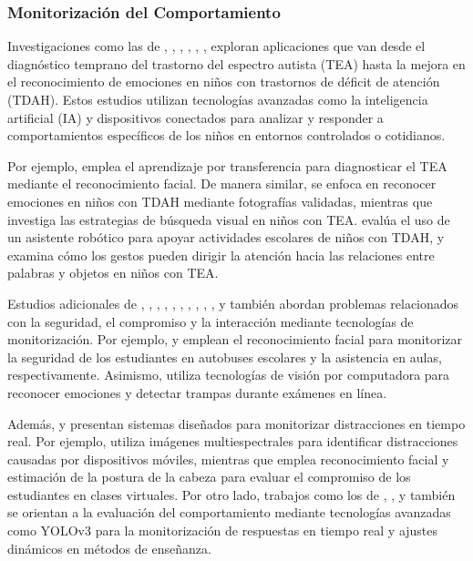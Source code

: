 \documentclass[a4paper,fleqn]{cas-sc}
\begin{document}
	\subsubsection{Monitorización del Comportamiento}
	Investigaciones como las de \cite{Akter2021}, \cite{Albrecht2014}, \cite{Berrezueta-Guzman2021}, \cite{Pelc2006}, \cite{VilliersRader2021}, \cite{Warren2015Brief}, \cite{Washington2016AWereable} exploran aplicaciones que van desde el diagnóstico temprano del trastorno del espectro autista (TEA) hasta la mejora en el reconocimiento de emociones en niños con trastornos de déficit de atención (TDAH). Estos estudios utilizan tecnologías avanzadas como la inteligencia artificial (IA) y dispositivos conectados para analizar y responder a comportamientos específicos de los niños en entornos controlados o cotidianos.
	
	Por ejemplo, \cite{Akter2021} emplea el aprendizaje por transferencia para diagnosticar el TEA mediante el reconocimiento facial. De manera similar, \cite{Pelc2006} se enfoca en reconocer emociones en niños con TDAH mediante fotografías validadas, mientras que \cite{Albrecht2014} investiga las estrategias de búsqueda visual en niños con TEA. \cite{Berrezueta-Guzman2021} evalúa el uso de un asistente robótico para apoyar actividades escolares de niños con TDAH, y \cite{VilliersRader2021} examina cómo los gestos pueden dirigir la atención hacia las relaciones entre palabras y objetos en niños con TEA.
	
	Estudios adicionales de \cite{Boumiza2017}, \cite{DaCosta2023}, \cite{Enadula2021}, \cite{Farsani2020}, \cite{Hachad2020}, \cite{James2019},  \cite{Kulkarni2023}, \cite{Kumar2024Zoom}, \cite{Muller2018ArchnSmile}, \cite{Narkhede2023}, y \cite{Ozdamli2022} también abordan problemas relacionados con la seguridad, el compromiso y la interacción mediante tecnologías de monitorización. Por ejemplo, \cite{Hachad2020} y \cite{James2019} emplean el reconocimiento facial para monitorizar la seguridad de los estudiantes en autobuses escolares y la asistencia en aulas, respectivamente. Asimismo, \cite{Ozdamli2022} utiliza tecnologías de visión por computadora para reconocer emociones y detectar trampas durante exámenes en línea.
	
	Además, \cite{Campbell2015Using} y \cite{Ucar2022Recognizing} presentan sistemas diseñados para monitorizar distracciones en tiempo real. Por ejemplo, \cite{Campbell2015Using} utiliza imágenes multiespectrales para identificar distracciones causadas por dispositivos móviles, mientras que \cite{Ucar2022Recognizing} emplea reconocimiento facial y estimación de la postura de la cabeza para evaluar el compromiso de los estudiantes en clases virtuales. Por otro lado, trabajos como los de \cite{Argel2023Intellitell}, \cite{Erazo2016Easing}, y \cite{Nguyen2019} también se orientan a la evaluación del comportamiento mediante tecnologías avanzadas como YOLOv3 para la monitorización de respuestas en tiempo real y ajustes dinámicos en métodos de enseñanza.
	
\end{document}
